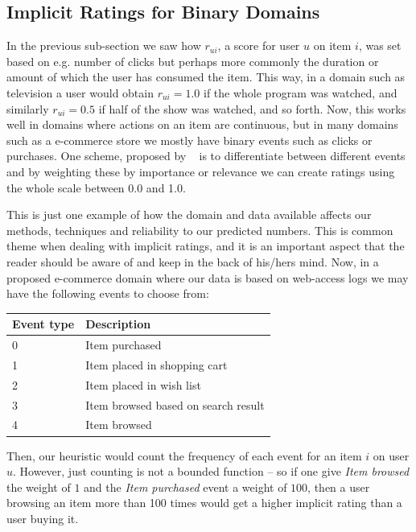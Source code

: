 \subsection{Implicit Ratings for Binary Domains}
\label{implicit-binary-domains}

In the previous sub-section we saw how $r_{ui}$, a score for user $u$ on item
$i$, was set based on e.g. number of clicks but perhaps more commonly the
duration or amount of which the user has consumed the item. This way, in a
domain such as television a user would obtain $r_{ui} = 1.0$ if the whole
program was watched, and similarly $r_{ui} = 0.5$ if half of the show was
watched, and so forth. Now, this works well in domains where actions on an item
are continuous, but in many domains such as a e-commerce store we mostly have
binary events such as clicks or purchases. One scheme, proposed by
~\cite{pkghost2014implicit} is to differentiate between different events and by
weighting these by importance or relevance we can create ratings using the
whole scale between 0.0 and 1.0.

This is just one example of how the domain and data available affects our
methods, techniques and reliability to our predicted numbers. This is common
theme when dealing with implicit ratings, and it is an important aspect that
the reader should be aware of and keep in the back of his/hers mind. Now, in a
proposed e-commerce domain where our data is based on web-access logs we may
have the following events to choose from:

\begin{table}[H]
  \centering
  \begin{tabular}{ll}
  \toprule
  Event type & Description \\ \midrule
  0 & Item purchased \\
  1 & Item placed in shopping cart \\
  2 & Item placed in wish list \\
  3 & Item browsed based on search result \\
  4 & Item browsed \\
  \bottomrule
  \end{tabular}
\end{table}

Then, our heuristic would count the frequency of each event for an item $i$ on
user $u$. However, just counting is not a bounded function -- so if one give
\textit{Item browsed} the weight of $1$ and the \textit{Item purchased} event
a weight of $100$, then a user browsing an item more than 100 times would get a
higher implicit rating than a user buying it.

